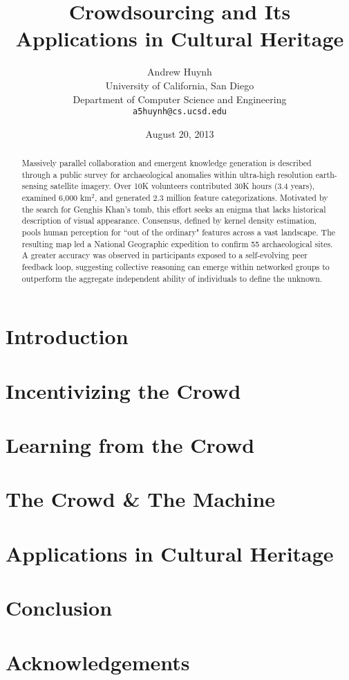 \documentclass[10pt,twocolumn]{article}
\begin{document}
\title{Crowdsourcing and Its Applications in Cultural Heritage}

\author{Andrew Huynh\\
University of California, San Diego\\
Department of Computer Science and Engineering\\
\texttt{a5huynh@cs.ucsd.edu}
}

\date{August 20, 2013}

\maketitle

\begin{abstract}
Massively parallel collaboration and emergent knowledge generation is described through a public survey for archaeological anomalies within ultra-high resolution earth-sensing satellite imagery.  Over 10K volunteers contributed 30K hours (3.4 years), examined 6,000 km$^2$, and generated 2.3 million feature categorizations. Motivated by the search for Genghis Khan's tomb, this effort seeks an enigma that lacks historical description of visual appearance. Consensus, defined by kernel density estimation, pools human perception for ``out of the ordinary" features across a vast landscape. The resulting map led a National Geographic expedition to confirm 55 archaeological sites.  A greater accuracy was observed in participants exposed to a self-evolving peer feedback loop, suggesting collective reasoning can emerge within networked groups to outperform the aggregate independent ability of individuals to define the unknown.
\end{abstract}

\section{Introduction}
\section{Incentivizing the Crowd}
\section{Learning from the Crowd}
\section{The Crowd \& The Machine}
\section{Applications in Cultural Heritage}
\section{Conclusion}
\section{Acknowledgements}
\end{document}
